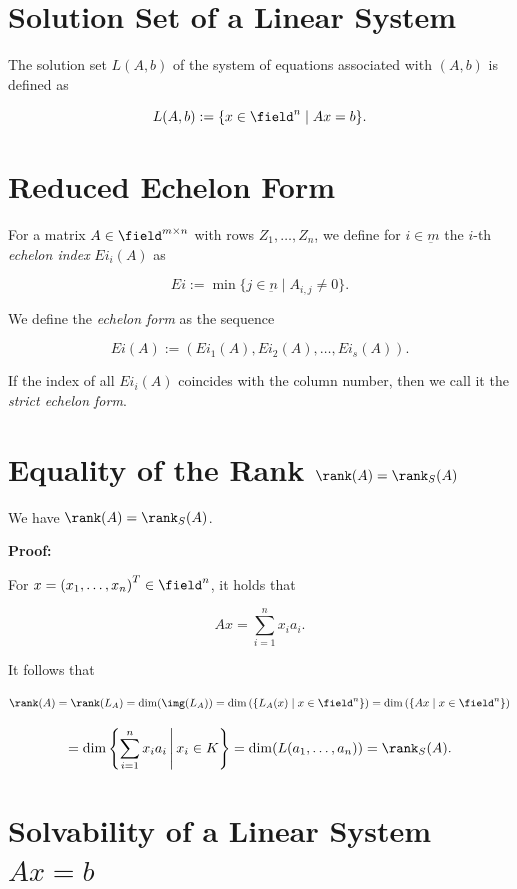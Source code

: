 \section{Solution Set of a Linear System}

The solution set \( L(A, b) \) of the system of equations associated with \( (A, b) \) is defined as

\[
    L(A, b) := \{ x \in \field^n \mid Ax = b \}.
\]

\section{Reduced Echelon Form}

For a matrix \(A \in \field^{m \times n}\) with rows \(Z_1, \dots, Z_n\), we define for \(i \in \underbar{m}\) the \(i\)-th \emph{echelon index} 
\(Ei_i(A)\) as 

\[
    Ei := \min \{j \in \underbar{n} \mid A_{i,j} \ne 0\}.
\]

We define the \emph{echelon form} as the sequence 

\[
    Ei(A) := (Ei_1 (A), Ei_2 (A), \dots,Ei_s (A)).
\]

If the index of all \(Ei_i(A)\) coincides with the column number, then we call it the \emph{strict echelon form}.

\section{Equality of the Rank \texorpdfstring{\(\rank(A) = \rank_S(A)\)}{}}

We have \(\rank(A) = \rank_S(A)\).

\textbf{Proof:}

For \(x = {(x_1, \ldots, x_n)}^T \in \field^n\), it holds that

\[
    Ax = \sum_{i=1}^{n} x_i a_i.
\]

It follows that

\[
    \rank(A) = \rank(L_A) = \dim(\img(L_A))
    = \dim\left(\{L_A(x) \mid x \in \field^n\}\right)
    = \dim\left(\{Ax \mid x \in \field^n\}\right)
\]

\[
    = \dim\left\{ \sum_{i=1}^{n} x_i a_i \,\middle|\, x_i \in K \right\}
    = \dim(L(a_1, \ldots, a_n)) = \rank_S(A).
\]

\section{Solvability of a Linear System \texorpdfstring{\(Ax = b\)}{}}


